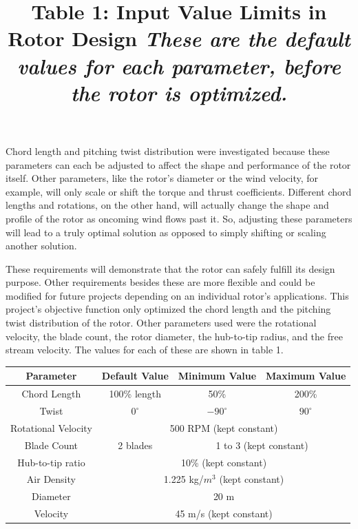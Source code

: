 \documentclass{article}
\begin{document}
\noindent Chord length and pitching twist distribution were investigated because these parameters can each be adjusted to affect the shape and performance of the rotor itself. Other parameters, like the rotor's diameter or the wind velocity, for example, will only scale or shift the torque and thrust coefficients. Different chord lengths and rotations, on the other hand, will actually change the shape and profile of the rotor as oncoming wind flows past it. So, adjusting these parameters will lead to a truly optimal solution as opposed to simply shifting or scaling another solution. \newline

\noindent These requirements will demonstrate that the rotor can safely fulfill its design purpose. Other requirements besides these are more flexible and could be modified for future projects depending on an individual rotor's applications. This project's objective function only optimized the chord length and the pitching twist distribution of the rotor. Other parameters used were the rotational velocity, the blade count, the rotor diameter, the hub-to-tip radius, and the free stream velocity. The values for each of these are shown in table 1. \newline

\centering
\title{Table 1: Input Value Limits in Rotor Design \newline}
\title{\emph{These are the default values for each parameter, before the rotor is optimized.}} \label{table:1} \newline
\begin{tabular}{| c | c | c | c |}
	 \hline
  	 \textbf{Parameter} & \textbf{Default Value} & \textbf{Minimum Value} & \textbf{Maximum Value} \\ \hline
	 Chord Length & 100\% length & 50\% & 200\% \\ \hline
	 Twist & $0^{\circ}$ & $-90^{\circ}$ & $90^{\circ}$ \\ \hline
	 Rotational Velocity & \multicolumn{3}{c|}{500 RPM (kept constant)} \\ \hline
	 Blade Count & 2 blades & \multicolumn{2}{c|}{1 to 3 (kept constant)}\\ \hline
	 Hub-to-tip ratio & \multicolumn{3}{c|}{10\% (kept constant)} \\ \hline
	 Air Density & \multicolumn{3}{c|}{1.225 kg/$m^{3}$ (kept constant)} \\ \hline
	 Diameter & \multicolumn{3}{c|}{20 m} \\ \hline
	 Velocity & \multicolumn{3}{c|}{45 m/s (kept constant)} \\ \hline
\end{tabular} \break \newline
\end{document}
